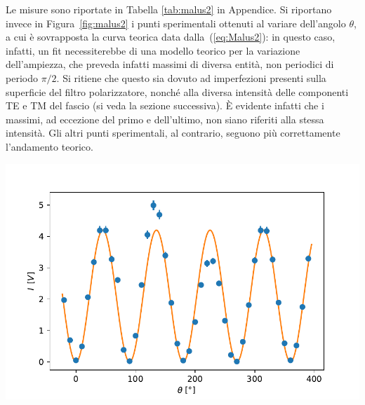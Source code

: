 \documentclass[10pt,oneside,a4paper]{article}
\newenvironment{Figure}
  {\par\medskip\noindent\minipage{\linewidth}}
  {\endminipage\par\medskip}
\begin{document}
\begin{multicols}{2}
Le misure sono riportate in Tabella \ref{tab:malus2} in Appendice. Si riportano invece in Figura~\ref{fig:malus2} i punti sperimentali ottenuti al variare dell'angolo $\theta$, a cui è sovrapposta la curva teorica data dalla~(\ref{eq:Malus2}): in questo caso, infatti, un fit necessiterebbe di una modello teorico per la variazione dell'ampiezza, che preveda infatti massimi di diversa entità, non periodici di periodo $\pi / 2$. Si ritiene che questo sia dovuto ad imperfezioni presenti sulla superficie del filtro polarizzatore, nonché alla diversa intensità delle componenti TE e TM del fascio (si veda la sezione successiva). È evidente infatti che i massimi, ad eccezione del primo e dell'ultimo, non siano riferiti alla stessa intensità. Gli altri punti sperimentali, al contrario, seguono più correttamente l'andamento teorico.

\begin{Figure}
	\begin{center}
	\includegraphics[width=\linewidth]{malus2.pdf}
	\label{fig:malus2}
	\end{center}
\end{Figure}


\end{multicols}
\end{document}

